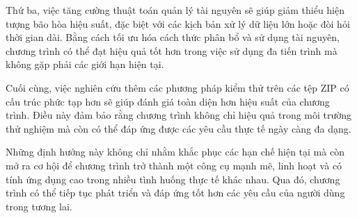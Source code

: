 \documentclass[../DoAn.tex]{subfiles}
\begin{document}
Thứ ba, việc tăng cường thuật toán quản lý tài nguyên sẽ giúp giảm thiểu hiện tượng bão hòa hiệu suất, đặc biệt với các kịch bản xử lý dữ liệu lớn hoặc đòi hỏi thời gian dài. Bằng cách tối ưu hóa cách thức phân bổ và sử dụng tài nguyên, chương trình có thể đạt hiệu quả tốt hơn trong việc sử dụng đa tiến trình mà không gặp phải các giới hạn hiện tại.

Cuối cùng, việc nghiên cứu thêm các phương pháp kiểm thử trên các tệp ZIP có cấu trúc phức tạp hơn sẽ giúp đánh giá toàn diện hơn hiệu suất của chương trình. Điều này đảm bảo rằng chương trình không chỉ hiệu quả trong môi trường thử nghiệm mà còn có thể đáp ứng được các yêu cầu thực tế ngày càng đa dạng.

Những định hướng này không chỉ nhằm khắc phục các hạn chế hiện tại mà còn mở ra cơ hội để chương trình trở thành một công cụ mạnh mẽ, linh hoạt và có tính ứng dụng cao trong nhiều tình huống thực tế khác nhau. Qua đó, chương trình có thể tiếp tục phát triển và đáp ứng tốt hơn các yêu cầu của người dùng trong tương lai.
\end{document}
